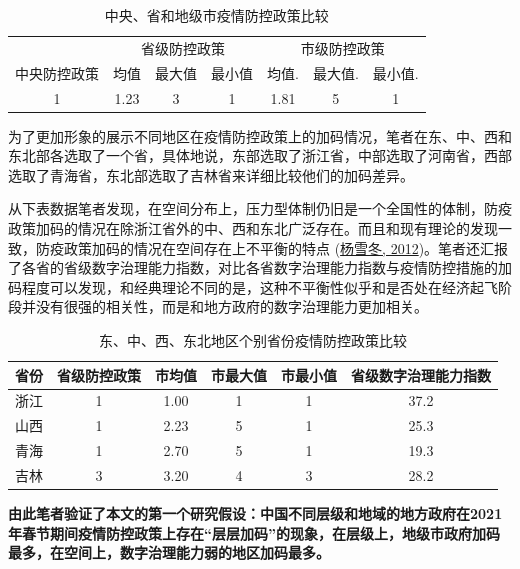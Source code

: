 \documentclass[
  12pt,
]{ctexart}
\begin{document}
\begin{table}[!h]

\caption{\label{tab:unnamed-chunk-2}中央、省和地级市疫情防控政策比较}
\centering
\begin{tabular}[t]{ccccccc}
\toprule
\multicolumn{1}{c}{ } & \multicolumn{3}{c}{省级防控政策} & \multicolumn{3}{c}{市级防控政策} \\
\cmidrule(l{3pt}r{3pt}){2-4} \cmidrule(l{3pt}r{3pt}){5-7}
中央防控政策 & 均值 & 最大值 & 最小值 & 均值. & 最大值. & 最小值.\\
\midrule
1 & 1.23 & 3 & 1 & 1.81 & 5 & 1\\
\bottomrule
\end{tabular}
\end{table}

为了更加形象的展示不同地区在疫情防控政策上的加码情况，笔者在东、中、西和东北部各选取了一个省，具体地说，东部选取了浙江省，中部选取了河南省，西部选取了青海省，东北部选取了吉林省来详细比较他们的加码差异。

从下表数据笔者发现，在空间分布上，压力型体制仍旧是一个全国性的体制，防疫政策加码的情况在除浙江省外的中、西和东北广泛存在。而且和现有理论的发现一致，防疫政策加码的情况在空间存在上不平衡的特点 (\protect\hyperlink{ref-YangXueDong2012}{杨雪冬, 2012})。笔者还汇报了各省的省级数字治理能力指数，对比各省数字治理能力指数与疫情防控措施的加码程度可以发现，和经典理论不同的是，这种不平衡性似乎和是否处在经济起飞阶段并没有很强的相关性，而是和地方政府的数字治理能力更加相关。

\begin{table}[!h]

\caption{\label{tab:unnamed-chunk-3}东、中、西、东北地区个别省份疫情防控政策比较}
\centering
\begin{tabular}[t]{cccccc}
\toprule
省份 & 省级防控政策 & 市均值 & 市最大值 & 市最小值 & 省级数字治理能力指数\\
\midrule
浙江 & 1 & 1.00 & 1 & 1 & 37.2\\
山西 & 1 & 2.23 & 5 & 1 & 25.3\\
青海 & 1 & 2.70 & 5 & 1 & 19.3\\
吉林 & 3 & 3.20 & 4 & 3 & 28.2\\
\bottomrule
\end{tabular}
\end{table}

\textbf{由此笔者验证了本文的第一个研究假设：中国不同层级和地域的地方政府在2021年春节期间疫情防控政策上存在``层层加码''的现象，在层级上，地级市政府加码最多，在空间上，数字治理能力弱的地区加码最多。}
\end{document}
